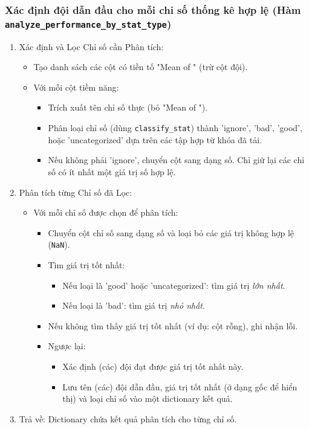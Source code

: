 \documentclass[12pt, a4paper]{report}
\begin{document}
\subsubsection*{Xác định đội dẫn đầu cho mỗi chỉ số thống kê hợp lệ \sloppypar
(Hàm \texttt{analyze\_performance\_by\_stat\_type})}
\begin{enumerate}[label*=\textbf{Bước \arabic*:}, leftmargin=*]
    \item Xác định và Lọc Chỉ số cần Phân tích:
    \begin{itemize}[leftmargin=0em]
        \item Tạo danh sách các cột có tiền tố "Mean of " (trừ cột đội).
        \item Với mỗi cột tiềm năng:
        \begin{itemize}
            \item Trích xuất tên chỉ số thực (bỏ "Mean of ").
            \item Phân loại chỉ số (dùng \texttt{classify\_stat}) thành 'ignore', 'bad', 'good', hoặc 'uncategorized' dựa trên các tập hợp từ khóa đã tải.
            \item Nếu không phải 'ignore', chuyển cột sang dạng số. Chỉ giữ lại các chỉ số có ít nhất một giá trị số hợp lệ.
        \end{itemize}
    \end{itemize}
    \item Phân tích từng Chỉ số đã Lọc:
    \begin{itemize}[leftmargin=0em]
        \item Với mỗi chỉ số được chọn để phân tích:
        \begin{itemize}
            \item Chuyển cột chỉ số sang dạng số và loại bỏ các giá trị không hợp lệ (\texttt{NaN}).
            \item Tìm giá trị tốt nhất:
            \begin{itemize}
                \item Nếu loại là 'good' hoặc 'uncategorized': tìm giá trị \textit{lớn nhất}.
                \item Nếu loại là 'bad': tìm giá trị \textit{nhỏ nhất}.
            \end{itemize}
            \item Nếu không tìm thấy giá trị tốt nhất (ví dụ: cột rỗng), ghi nhận lỗi.
            \item Ngược lại:
            \begin{itemize}
                \item Xác định (các) đội đạt được giá trị tốt nhất này.
                \item Lưu tên (các) đội dẫn đầu, giá trị tốt nhất (ở dạng gốc để hiển thị) và loại chỉ số vào một dictionary kết quả.
            \end{itemize}
        \end{itemize}
    \end{itemize}
    \item Trả về: Dictionary chứa kết quả phân tích cho từng chỉ số.
\end{enumerate}
\end{document}
